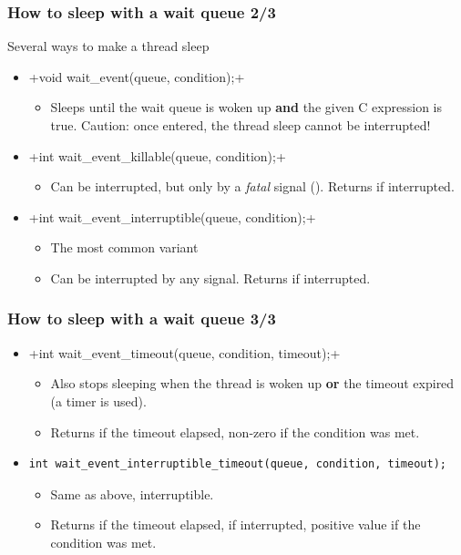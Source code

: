 \begin{frame}[fragile]
  \frametitle{How to sleep with a wait queue 2/3}
  Several ways to make a thread sleep
  \begin{itemize}
  \item {}+void wait_event(queue, condition);+
    \begin{itemize}
    \item Sleeps until the wait queue is woken up {\bf and} the given C
      expression is true. Caution: once entered, the thread sleep
      cannot be interrupted!
    \end{itemize}
  \item {}+int wait_event_killable(queue, condition);+
    \begin{itemize}
    \item Can be interrupted, but only by a \emph{fatal} signal
      (). Returns \code{-} if interrupted.
    \end{itemize}
  \item {}+int wait_event_interruptible(queue, condition);+
    \begin{itemize}
    \item The most common variant
    \item Can be interrupted by any signal. Returns
      \code{-} if interrupted.
    \end{itemize}
  \end{itemize}
\end{frame}

\begin{frame}[fragile]
  \frametitle{How to sleep with a wait queue 3/3}
  \begin{itemize}
  \item {}+int wait_event_timeout(queue, condition, timeout);+
    \begin{itemize}
    \item Also stops sleeping when the thread is woken up {\bf or} the
      timeout expired (a timer is used).
    \item Returns  if the timeout elapsed, non-zero if
      the condition was met.
    \end{itemize}
  \item \begin{verbatim}
int wait_event_interruptible_timeout(queue, condition, timeout);
  \end{verbatim}
    \begin{itemize}
    \item Same as above, interruptible.
    \item Returns  if the timeout
      elapsed, \code{-} if interrupted, positive value if
      the condition was met.
    \end{itemize}
  \end{itemize}
\end{frame}

